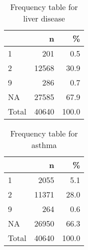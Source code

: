 \documentclass[
]{article}
\newenvironment{Shaded}{\begin{snugshade}}{\end{snugshade}}
\newcommand{\DataTypeTok}[1]{\textcolor[rgb]{0.13,0.29,0.53}{#1}}
\newcommand{\DecValTok}[1]{\textcolor[rgb]{0.00,0.00,0.81}{#1}}
\newcommand{\KeywordTok}[1]{\textcolor[rgb]{0.13,0.29,0.53}{\textbf{#1}}}
\newcommand{\NormalTok}[1]{#1}
\newcommand{\OperatorTok}[1]{\textcolor[rgb]{0.81,0.36,0.00}{\textbf{#1}}}
\newcommand{\OtherTok}[1]{\textcolor[rgb]{0.56,0.35,0.01}{#1}}
\newcommand{\StringTok}[1]{\textcolor[rgb]{0.31,0.60,0.02}{#1}}
\begin{document}
\begin{table}[!h]

\caption{\label{tab:unnamed-chunk-25}Frequency table for liver disease}
\centering
\begin{tabular}[t]{l|r|r}
\hline
  & n & \%\\
\hline
1 & 201 & 0.5\\
\hline
2 & 12568 & 30.9\\
\hline
9 & 286 & 0.7\\
\hline
NA & 27585 & 67.9\\
\hline
Total & 40640 & 100.0\\
\hline
\end{tabular}
\end{table}

\begin{Shaded}
\end{Shaded}

\begin{table}[!h]

\caption{\label{tab:unnamed-chunk-26}Frequency table for asthma}
\centering
\begin{tabular}[t]{l|r|r}
\hline
  & n & \%\\
\hline
1 & 2055 & 5.1\\
\hline
2 & 11371 & 28.0\\
\hline
9 & 264 & 0.6\\
\hline
NA & 26950 & 66.3\\
\hline
Total & 40640 & 100.0\\
\hline
\end{tabular}
\end{table}
\end{document}
